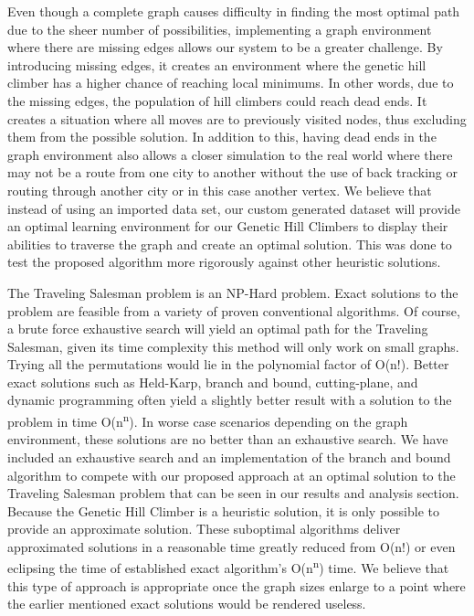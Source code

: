 \documentclass[sigplan,screen]{acmart}
\begin{document}
Even though a complete graph causes difficulty in finding the most optimal path
due to the sheer number of possibilities, implementing a graph environment where
there are missing edges allows our system to be a greater challenge. By
introducing missing edges, it creates an environment where the genetic hill
climber has a higher chance of reaching local minimums. In other words, due to
the missing edges, the population of hill climbers could reach dead ends. It
creates a situation where all moves are to previously visited nodes, thus
excluding them from the possible solution. In addition to this, having dead ends
in the graph environment also allows a closer simulation to the real world where
there may not be a route from one city to another without the use of back
tracking or routing through another city or in this case another vertex. We
believe that instead of using an imported data set, our custom generated dataset
will provide an optimal learning environment for our Genetic Hill Climbers to
display their abilities to traverse the graph and create an optimal solution.
This was done to test the proposed algorithm more rigorously against other
heuristic solutions.

The Traveling Salesman problem is an NP-Hard problem. Exact solutions to the
problem are feasible from a variety of proven conventional algorithms. Of
course, a brute force exhaustive search will yield an optimal path for the
Traveling Salesman, given its time complexity this method will only work on
small graphs. Trying all the permutations would lie in the polynomial factor of
O(n!). Better exact solutions such as Held-Karp, branch and bound,
cutting-plane, and dynamic programming often yield a slightly better result with
a solution to the problem in time O(n\textsuperscript{n}). In worse case
scenarios depending on the graph environment, these solutions are no better than
an exhaustive search. We have included an exhaustive search and an
implementation of the branch and bound algorithm to compete with our proposed
approach at an optimal solution to the Traveling Salesman problem that can be
seen in our results and analysis section. Because the Genetic Hill Climber is a
heuristic solution, it is only possible to provide an approximate solution.
These suboptimal algorithms deliver approximated solutions in a reasonable time
greatly reduced from O(n!) or even eclipsing the time of established exact
algorithm’s O(n\textsuperscript{n}) time. We believe that this type of approach
is appropriate once the graph sizes enlarge to a point where the earlier
mentioned exact solutions would be rendered useless.
\end{document}
